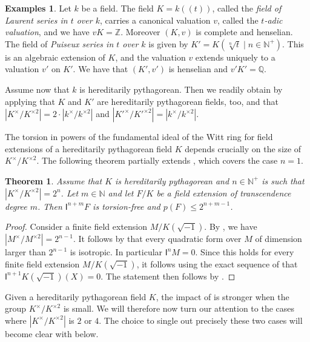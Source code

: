 \documentclass[12pt,leqno]{amsart}
\newcommand{\qq}{\mathbb Q}
\newcommand{\nat}{\mathbb{N}}
\newcommand{\zz}{\mathbb Z}
\newcommand{\mg}[1]{#1^{\times}}
\newcommand{\sq}[1]{#1^{\times 2}}
\newcommand{\scg}[1]{\mg{#1}/\sq{#1}}
\renewcommand{\leq}{\leqslant}
\newcommand{\I}{\mathsf{I}}
\numberwithin{equation}{section}
\newtheorem{thm}[equation]{Theorem}
\theoremstyle{definition}
\newtheorem{exs}[equation]{Examples}
\theoremstyle{plain}
\begin{document}
\begin{exs}\label{EX:hp}
Let $k$ be a field. 
The field $K=k(\!(t)\!)$, called the \emph{field of Laurent series in $t$ over $k$}, carries a canonical valuation $v$, called the \emph{$t$-adic valuation}, and we have $vK=\zz$.
Moreover $(K,v)$ is complete and henselian.
The field of \emph{Puiseux series in $t$ over $k$} is given by $K'=K(\sqrt[n]{t}\mid n\in\nat^+)$. 
This is an algebraic extension of $K$, and the valuation $v$ extends uniquely to a valuation $v'$ on $K'$.  
We have that $(K',v')$ is henselian and $v'K'=\qq$.

Assume now that $k$ is hereditarily pythagorean.
Then we readily obtain by applying  that $K$ and $K'$ are hereditarily pythagorean fields, too, and that $|\scg{K}|=2\cdot|\scg{k}|$ and $|\scg{K'}|=|\scg{k}|$.
\end{exs}

The torsion in powers of the fundamental ideal of the Witt ring for field extensions of a hereditarily pythagorean field $K$ depends crucially on the size of $\scg{K}$.
The following theorem partially extends \cite[Theorem]{EW87}, which covers the case $n=1$.

\begin{thm}\label{C:hp-general-transc-p-bound}
Assume that $K$ is hereditarily pythagorean and $n\in\nat^+$ is such that $|\scg{K}|=2^{n}$.
Let $m\in\nat$ and let $F/K$ be a field extension of transcendence degree $m$.
Then $\I^{n+m}F$ is torsion-free and $p(F)\leq 2^{n+m-1}$.
\end{thm}
\begin{proof}
Consider a finite field extension $M/K(\sqrt{-1})$.
By , we have $|\scg{M}|=2^{n-1}$.
It follows by \cite[Chap.~XI, Theorem 6.4]{Lam05} that every quadratic form over $M$ of dimension larger than $2^{n-1}$ is isotropic. In particular $\I^nM=0$.
Since this holds for every finite field extension $M/K(\sqrt{-1})$, 
it follows using the exact sequence of \cite[Cor.~21.3]{EKM08} that $\I^{n+1} K(\sqrt{-1})(X)=0$.
The statement then follows by .
\end{proof}

Given a hereditarily pythagorean field $K$, the impact of  is stronger when the group $\scg{K}$ is small. We will therefore now turn our attention to the cases where $|\scg{K}|$ is $2$ or $4$. The choice to single out precisely these two cases will become clear with  below.
\end{document}
